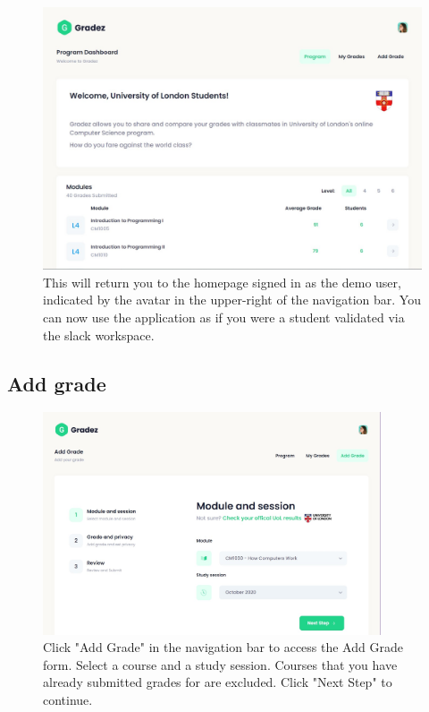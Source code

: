\begin{figure}[H]
    \centering
    \includegraphics[width=15cm]{images/user-guide/demo-sign-in/2.jpg}
    \caption{This will return you to the homepage signed in as the demo user, indicated by the avatar in the upper-right of the navigation bar. You can now use the application as if you were a student validated via the slack workspace.}
    \label{fig:demosignin2}
\end{figure}

\subsection{Add grade}\label{sec:addgrade}

\begin{figure}[H]
    \centering
    \includegraphics[width=10cm]{images/user-guide/add-grade/1.jpg}
    \caption{Click "Add Grade" in the navigation bar to access the Add Grade form. Select a course and a study session. Courses that you have already submitted grades for are excluded. Click "Next Step" to continue.}
    \label{fig:addgrade1}
\end{figure}

